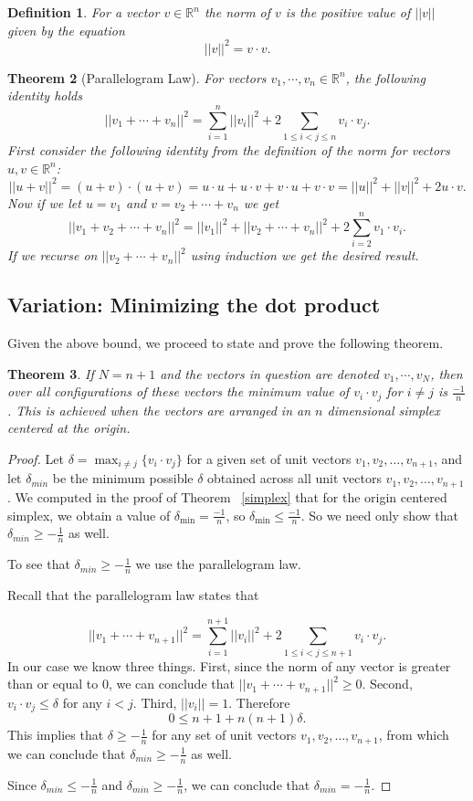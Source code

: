 \documentclass[11pt,letterpaper,twoside,english]{article}
\theoremstyle{theorem}
\newtheorem{theorem}{Theorem}[section]
\newtheorem{definition}[theorem]{Definition}
\theoremstyle{remark}
\providecommand{\R}{\mathbb{R}}
\begin{document}
\begin{definition}
For a vector $v\in\R^n$ the norm of $v$ is the positive value of $||v||$ given by the equation
$$
||v||^2=v\cdot v.
$$
\end{definition}
\begin{theorem}[Parallelogram Law]
For vectors $v_1,\cdots,v_n\in\R^n$, the following identity holds
$$
||v_1+\cdots+v_n||^2=\displaystyle\sum_{i=1}^n||v_i||^2+2\displaystyle\sum_{1\le i<j\le n}v_i\cdot v_j.
$$
\proof
First consider the following identity from the definition of the norm for vectors $u,v\in\R^n$:
$$
||u+v||^2=(u+v)\cdot (u+v)=u\cdot u+u\cdot v+ v\cdot u + v\cdot v=||u||^2+||v||^2+2u\cdot v.
$$
Now if we let $u=v_1$ and $v= v_2+\cdots+v_n$ we get 
$$
||v_1+v_2+\cdots+v_n||^2=||v_1||^2+||v_2+\cdots +v_n||^2+2\sum_{i=2}^n v_1\cdot v_i.
$$
If we recurse on $||v_2+\cdots +v_n||^2$ using induction we get the desired result. 
\end{theorem}


\subsection{Variation: Minimizing the dot product}
Given the above bound, we proceed to state and prove the following theorem.


\begin{theorem}
If $N=n+1$ and the vectors in question are denoted $v_1,\cdots, v_N$, then over all configurations of these vectors the minimum value of $v_i\cdot v_j$ for $i\neq j$ is $\frac{-1}{n}$. This is achieved when the vectors are arranged in an $n$ dimensional simplex centered at the origin.  
\end{theorem}

\begin{proof}
Let $\delta= \max_{i\neq j}\{v_i\cdot v_j\}$ for a given set of unit vectors $v_1, v_2, \ldots, v_{n+1}$, and let $\delta_{min}$ be the minimum possible $\delta$ obtained across all unit vectors $v_1, v_2, \ldots, v_{n+1}$. We computed in the proof of Theorem ~\ref{simplex} that for the origin centered simplex, we obtain a value of $\delta_{\min}=\frac{-1}{n}$, so $\delta_{\min}\le\frac{-1}{n}$. So we need only show that $\delta_{min} \geq -\frac{1}{n}$ as well. 


To see that $\delta_{min} \ge-\frac{1}{n}$ we use the parallelogram law.

Recall that the parallelogram law states that 

$$
||v_1+\cdots+v_{n+1}||^2=\displaystyle\sum_{i=1}^{n+1}||v_i||^2+2\displaystyle\sum_{1\le i<j\le n+1}v_i\cdot v_j.
$$
In our case we know three things. First, since the norm of any vector is greater than or equal to $0$, we can conclude that $||v_1 + \cdots + v_{n+1}||^2 \geq 0$. Second, $v_i\cdot v_j\le\delta$ for any $i<j$. Third, $||v_i||=1$. Therefore 
$$
0\le n+1+n(n+1)\delta.
$$
This implies that $\delta\ge -\frac{1}{n}$ for any set of unit vectors $v_1, v_2, \ldots, v_{n+1}$, from which we can conclude that $\delta_{min} \ge -\frac{1}{n}$ as well.

Since $\delta_{min} \le -\frac{1}{n}$ and $\delta_{min} \ge -\frac{1}{n}$, we can conclude that $\delta_{min}=-\frac{1}{n}$.
\end{proof}
\end{document}
